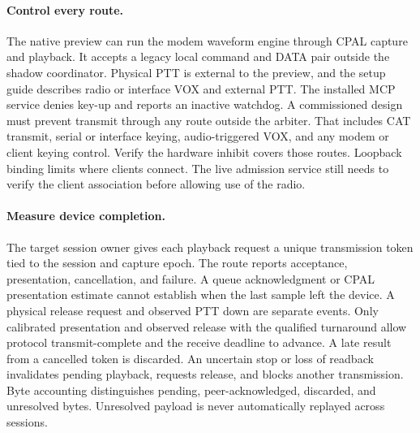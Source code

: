 
\begin{samepage}
\paragraph{Control every route.}
The native  preview can run the modem
waveform engine through CPAL capture and playback. It accepts a legacy local
command and DATA pair outside the shadow coordinator. Physical PTT is
external to the preview, and the setup guide describes radio or interface
VOX and external PTT. The installed MCP service denies key-up and reports
an inactive watchdog. A commissioned design must prevent transmit through
any route outside the arbiter. That includes CAT transmit, serial or
interface keying, audio-triggered VOX, and any modem or client keying
control. Verify the hardware inhibit covers those routes. Loopback binding
limits where clients connect. The live admission service still needs to
verify the client association before allowing use of the radio.
\par
\end{samepage}

\paragraph{Measure device completion.}
The target session owner gives each playback request a unique transmission
token tied to the session and capture epoch. The route reports acceptance,
presentation, cancellation, and failure. A queue acknowledgment or CPAL
presentation estimate cannot establish when the last sample left the
device. A physical release request and observed PTT down are separate
events. Only calibrated presentation and observed release with the
qualified turnaround allow protocol transmit-complete and the receive
deadline to advance. A late result from a cancelled token is discarded.
An uncertain stop or loss of readback invalidates pending playback,
requests release, and blocks another transmission. Byte accounting
distinguishes pending, peer-acknowledged, discarded, and unresolved bytes.
Unresolved payload is never automatically replayed across sessions.

